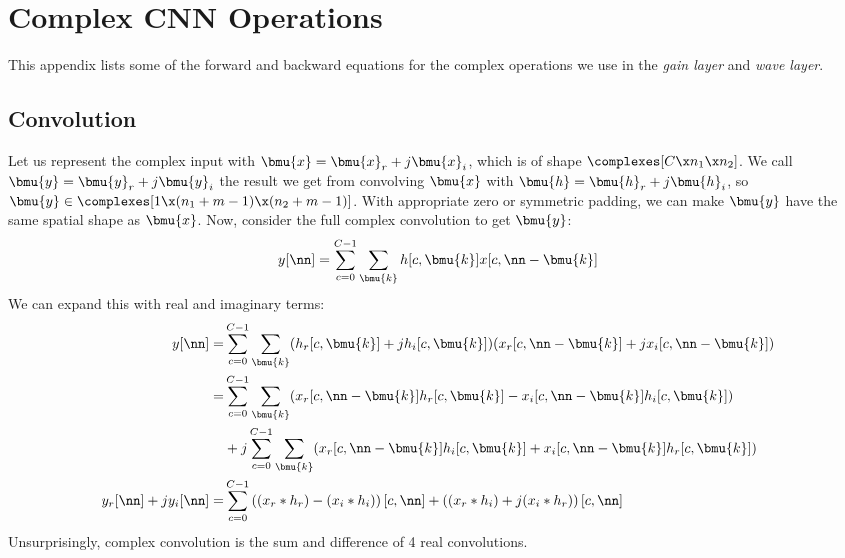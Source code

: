 \chapter{Complex CNN Operations}\label{app:ch6:complex_backprop}
\def \path {freqlearn/}
\def \imgpath {freqlearn/images}
This appendix lists some of the forward and backward equations for the
complex operations we use in the \emph{gain layer} and \emph{wave layer}.

\section{Convolution}\label{sec:appE:complex_conv}
\newcommand{\SigIn}{x}
\newcommand{\SigOut}{y}
\newcommand{\Filter}{h}
\newcommand{\SigInB}{\bmu{\SigIn}}
\newcommand{\SigOutB}{\bmu{\SigOut}}
\newcommand{\FilterB}{\bmu{\Filter}}
\newcommand{\kk}{\bmu{k}}
  
Let us represent the complex input with $\SigInB = \SigInB_r + j\SigInB_i$, which is of shape
$\complexes[C\x n_1\x n_2]$. We call $\SigOutB = \SigOutB_r + j\SigOutB_i$ the result we get from convolving
$\SigInB$ with $\FilterB= \FilterB_r + j\FilterB_i$, so $\SigOutB \in \complexes[1 \x (n_1 + m - 1) \x (n_2 + m -1)]$. With
appropriate zero or symmetric padding, we can make $\SigOutB$ have the same
spatial shape as $\SigInB$. Now, consider the full complex convolution to get
$\SigOutB$:
\begin{equation}
 \SigOut[\nn] = \sum_{c=0}^{C-1} \sum_{\kk} \Filter[c, \kk] \SigIn[c, \nn - \kk]
\end{equation}
We can expand this with real and imaginary terms:
\begin{align}
  \SigOut[\nn]  =&  \sum_{c=0}^{C-1} \sum_{\kk} (\Filter_r[c, \kk] +j\Filter_i[c, \kk]) 
        (\SigIn_r[c, \nn-\kk]+ j\SigIn_i[c, \nn - \kk]) \nonumber \\
  =&  \sum_{c=0}^{C-1} \sum_{\kk} (\SigIn_r[c, \nn - \kk] \Filter_r[c, \kk] - 
                                   \SigIn_i[c, \nn - \kk] \Filter_i[c, \kk]) \nonumber \\
   &+ j\sum_{c=0}^{C-1} \sum_{\kk} (\SigIn_r[c, \nn-\kk] \Filter_i[c, \kk] + 
          \SigIn_i[c, \nn - \kk] \Filter_r[c, \kk]) \nonumber\\
\SigOut_r[\nn] + j\SigOut_i[\nn]  =& \sum_{c=0}^{C-1} \left((\SigIn_r \ast \Filter_r) - (\SigIn_i \ast \Filter_i)\right)[c, \nn] + 
          \left((\SigIn_r \ast \Filter_i) + j(\SigIn_i \ast \Filter_r)\right)[c, \nn] \label{eq:app:complex_conv}
\end{align}
Unsurprisingly, complex convolution is the sum and difference of 4 real convolutions.

